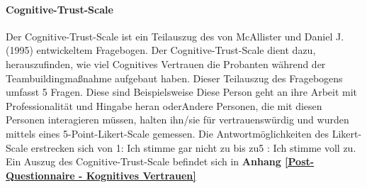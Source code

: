 \documentclass[a4paper,11pt]{article}%
\renewcommand{\\}{\vspace*{0.5\baselineskip} \newline}
\begin{document}
%			

		\paragraph{Cognitive-Trust-Scale}
Der Cognitive-Trust-Scale ist ein Teilauszug des von McAllister und Daniel J. (1995) \citep[p.37]{mcallister1995affect} entwickeltem Fragebogen. Der Cognitive-Trust-Scale dient dazu, herauszufinden, wie viel Cognitives Vertrauen die Probanten während der Teambuildingmaßnahme aufgebaut haben. Dieser Teilauszug des Fragebogens umfasst 5 Fragen. Diese sind Beispielsweise \dq{}Diese Person geht an ihre Arbeit mit Professionalität und Hingabe heran \dq{} oder\dq{}Andere Personen, die mit diesen Personen interagieren müssen, halten ihn/sie für vertrauenswürdig und wurden mittels eines 5-Point-Likert-Scale gemessen. Die Antwortmöglichkeiten des Likert-Scale erstrecken sich von \dq{}1: Ich stimme gar nicht zu \dq{} bis zu\dq{}5 : Ich stimme voll zu. 
\\Ein Auszug des Cognitive-Trust-Scale befindet sich in \textbf{Anhang \ref{Post-Questionnaire - Kognitives Vertrauen}}

  

\end{document}
